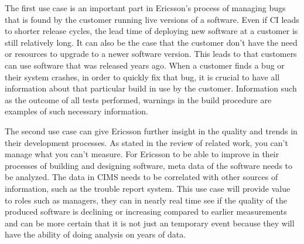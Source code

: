 The first use case is an important part in Ericsson's process of managing bugs that is found by the customer running live versions of a software. Even if CI leads to shorter release cycles, the lead time of deploying new software at a customer is still relatively long. It can also be the case that the customer don't have the need or resources to upgrade to a newer software version. This leads to that customers can use software that was released years ago. When a customer finds a bug or their system crashes, in order to quickly fix that bug, it is crucial to have all information about that particular build in use by the customer. Information such as the outcome of all tests performed, warnings in the build procedure are examples of such necessary information. 

The second use case can give Ericsson further insight in the quality and trends in their development processes. As stated in the review of related work, you can't manage what you can't measure. For Ericsson to be able to improve in their processes of building and designing software, meta data of the software needs to be analyzed. The data in CIMS needs to be correlated with other sources of information, such as the trouble report system. This use case will provide value to roles such as managers, they can in nearly real time see if the quality of the produced software is declining or increasing compared to earlier measurements and can be more certain that it is not just an temporary event because they will have the ability of doing analysis on years of data. 






